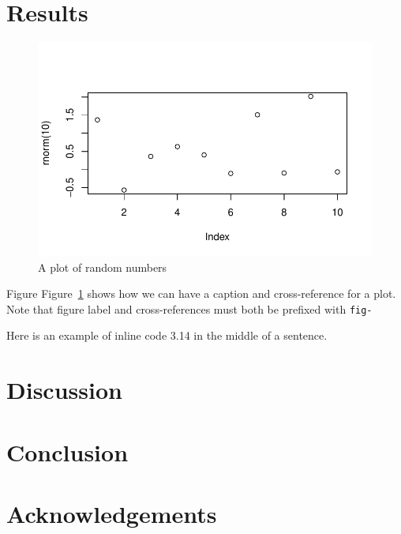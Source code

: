 \documentclass[
  number]{elsarticle}
\begin{document}
\hypertarget{results}{%
\section{Results}\label{results}}

\begin{figure}

{\centering \includegraphics{paper_files/figure-pdf/fig-demo-plot-1.pdf}

}

\caption{\label{fig-demo-plot}A plot of random numbers}

\end{figure}

Figure Figure~\ref{fig-demo-plot} shows how we can have a caption and
cross-reference for a plot. Note that figure label and cross-references
must both be prefixed with \texttt{fig-}

Here is an example of inline code 3.14 in the middle of a sentence.

\hypertarget{discussion}{%
\section{Discussion}\label{discussion}}

\hypertarget{conclusion}{%
\section{Conclusion}\label{conclusion}}

\hypertarget{acknowledgements}{%
\section{Acknowledgements}\label{acknowledgements}}
\end{document}
